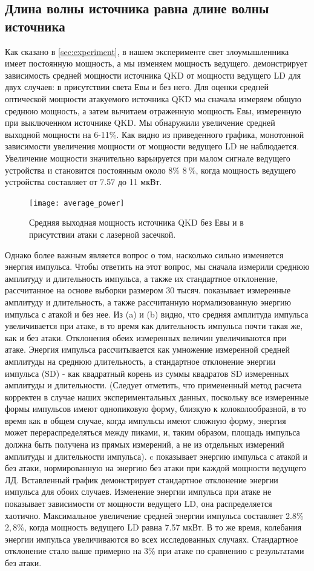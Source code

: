 \subsection{Длина волны источника равна длине волны источника}

Как сказано в \cref{sec:experiment}, в нашем эксперименте свет злоумышленника имеет постоянную мощность, а мы изменяем мощность ведущего.  демонстрирует зависимость средней мощности источника QKD от мощности ведущего LD для двух случаев: в присутствии света Евы и без него. Для оценки средней оптической мощности атакуемого источника QKD мы сначала измеряем общую среднюю мощность, а затем вычитаем отраженную мощность Евы, измеренную при выключенном источнике QKD. Мы обнаружили увеличение средней выходной мощности на 6-11\%. Как видно из приведенного графика, монотонной зависимости увеличения мощности от мощности ведущего LD не наблюдается. Увеличение мощности значительно варьируется при малом сигнале ведущего устройства и становится постоянным около 8\% $8~\%$, когда мощность ведущего устройства составляет от 7.57 до 11 мкВт.
\begin{figure}
\texttt{[image: average\_power]}
\caption{Средняя выходная мощность источника QKD без Евы и в присутствии атаки с лазерной засечкой.}
\label{fig:average_power}
\end{figure}
Однако более важным является вопрос о том, насколько сильно изменяется энергия импульса. Чтобы ответить на этот вопрос, мы сначала измерили среднюю амплитуду и длительность импульса, а также их стандартное отклонение, рассчитанное на основе выборки размером 30 тысяч.  показывает измеренные амплитуду и длительность, а также рассчитанную нормализованную энергию импульса с атакой и без нее. Из (a) и (b) видно, что средняя амплитуда импульса увеличивается при атаке, в то время как длительность импульса почти такая же, как и без атаки. Отклонения обеих измеренных величин увеличиваются при атаке. Энергия импульса рассчитывается как умножение измеренной средней амплитуды на среднюю длительность, а стандартное отклонение энергии импульса (SD) - как квадратный корень из суммы квадратов SD измеренных амплитуды и длительности. (Следует отметить, что примененный метод расчета корректен в случае наших экспериментальных данных, поскольку все измеренные формы импульсов имеют однопиковую форму, близкую к колоколообразной, в то время как в общем случае, когда импульсы имеют сложную форму, энергия может перераспределяться между пиками, и, таким образом, площадь импульса должна быть получена из прямых измерений, а не из отдельных измерений амплитуды и длительности импульса). c показывает энергию импульса с атакой и без атаки, нормированную на энергию без атаки при каждой мощности ведущего ЛД. Вставленный график демонстрирует стандартное отклонение энергии импульса для обоих случаев. Изменение энергии импульса при атаке не показывает зависимости от мощности ведущего LD, она распределяется хаотично. Максимальное увеличение средней энергии импульса составляет 2.8\%$2,8\%$, когда мощность ведущего LD равна 7.57 мкВт. В то же время, колебания энергии импульса увеличиваются во всех исследованных случаях. Стандартное отклонение стало выше примерно на 3\% при атаке по сравнению с результатами без атаки.

